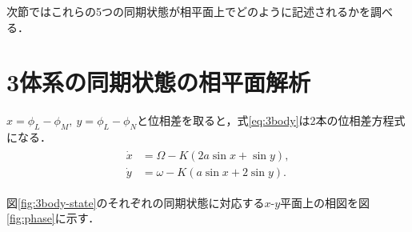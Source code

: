 \documentclass[../main]{subfiles}
\begin{document}
次節ではこれらの5つの同期状態が相平面上でどのように記述されるかを調べる．
\section{3体系の同期状態の相平面解析}
\label{sec:3body-phase-plane}
$x=\phi_L-\phi_M,\ y=\phi_L-\phi_N$と位相差を取ると，式\eqref{eq:3body}は2本の位相差方程式になる．
\begin{align}
    \label{eq:phase-diff}
    \begin{split}
    \dot{x}&=\Omega-K(2a\sin x+\sin y),\\
    \dot{y}&=\omega-K(a\sin x+2\sin y).
    \end{split}
\end{align}

図\ref{fig:3body-state}のそれぞれの同期状態に対応する$x$-$y$平面上の相図を図\ref{fig:phase}に示す．
\captionsetup[figure]{justification=centering}
\end{document}
